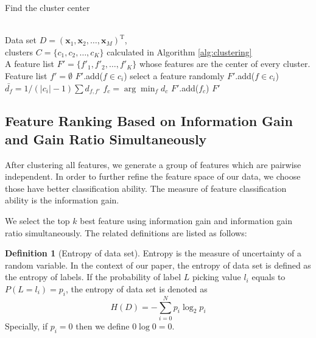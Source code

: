 \documentclass{ieeeaccess}
\theoremstyle{definition}
\newtheorem{defn}{Definition}
\begin{document}
\begin{algorithm}
\caption{Find the cluster center}
\label{alg:find-cluster-center}
\begin{algorithmic}[1]
\REQUIRE ~~\\
    Data set $D=(\bm{x}_1,\bm{x}_2,\ldots,\bm{x}_M)^\text{T}$, \\
    clusters $C=\{c_1, c_2, \ldots, c_K\}$ calculated in Algorithm \ref{alg:clustering}
\ENSURE ~~\\
    A feature list $F'=\{f'_1, f'_2, \ldots, f'_K\}$ whose features are the center of every cluster.
\STATE Feature list $f'=\emptyset$
        \STATE $F'$.add($f \in c_i$)
            \STATE select a feature randomly
            \STATE $F'$.add($f \in c_i$)
    \ELSE
            \STATE $\bar{d_f}=1/(|c_i|-1)\sum d_{f, f'}$
        \ENDFOR
        \STATE $f_c=\arg\min_f d_c$
        \STATE $F'$.add($f_c$)
    \ENDIF
\ENDFOR
\RETURN $F'$
\end{algorithmic}
\end{algorithm}

\subsection{Feature Ranking Based on Information Gain and Gain Ratio Simultaneously}

After clustering all features, we generate a group of features which are pairwise independent. In order to further refine the feature space of our data, we choose those have better classification ability. The measure of feature classification ability is the information gain.

We select the top $k$ best feature using information gain and information gain ratio simultaneously. The related definitions are listed as follows:

\begin{defn}[Entropy of data set]
    Entropy\cite{Shannon1948} is the measure of uncertainty of a random variable. In the context of our paper, the entropy of data set is defined as the entropy of labels. If the probability of label $L$ picking value $l_i$ equals to $P(L=l_i)=p_i$, the entropy of data set is denoted as
\begin{equation}
    H(D) = -\sum_{i=0}^N p_i \log_2 p_i
\end{equation}
    Specially, if $p_i=0$ then we define $0\log0 = 0$.
\end{defn}
\end{document}
